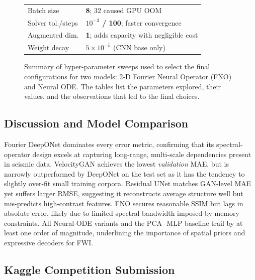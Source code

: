 \documentclass{article}
\begin{document}
\begin{figure}
\begin{minipage}[t]{0.48\linewidth}
\begin{tabularx}{\linewidth}{@{}l X@{}}
Batch size & \textbf{8}; 32 caused GPU OOM \\[2pt]

Solver tol./steps & \textbf{$10^{-3}$ / 100}; faster convergence \\[2pt]

Augmented dim. & \textbf{1}; adds capacity with negligible cost \\[2pt]

Weight decay & \textbf{$5\!\times\!10^{-5}$} (CNN base only) \\
\bottomrule
\end{tabularx}
\end{minipage}

\vspace{-6pt}
\caption{Summary of hyper-parameter sweeps used to select the final configurations for two models: 2-D Fourier Neural Operator (FNO) and Neural ODE. The tables list the parameters explored, their values, and the observations that led to the final choices.}
\label{tab:ablation_studies}
\end{figure}


\subsection{Discussion and Model Comparison}
Fourier DeepONet dominates every error metric, confirming that its
spectral-operator design excels at capturing long-range, multi-scale
dependencies present in seismic data.
VelocityGAN achieves the lowest \emph{validation} MAE, but is narrowly
outperformed by DeepONet on the test set as it has the tendency to
slightly over-fit small training corpora.
Residual UNet matches GAN-level MAE yet suffers larger RMSE, suggesting it
reconstructs average structure well but mis-predicts high-contrast features.
FNO secures reasonable SSIM but lags in absolute error, likely due to limited
spectral bandwidth imposed by memory constraints.
All Neural-ODE variants and the PCA\,-\,MLP baseline trail by at least one
order of magnitude, underlining the importance of spatial priors and expressive
decoders for FWI.

\subsection{Kaggle Competition Submission}
\end{document}
